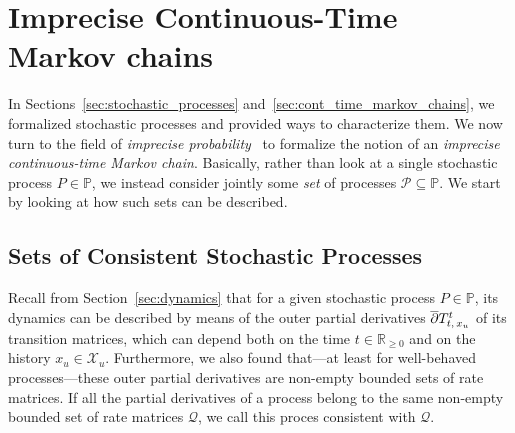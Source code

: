 \documentclass[10pt,a4paper]{paper}
\theoremstyle{definition}
\newtheorem{exmp}{Example}%
\newtheorem{proposition}[theorem]{Proposition}
\newcommand{\reals}{\mathbb{R}}
\newcommand{\realsnonneg}{\reals_{\geq 0}}
\newcommand{\states}{\mathcal{X}}
\newcommand{\processes}{\mathbb{P}}
\newcommand{\wmprocesses}{\processes^{\mathrm{WM}}}
\newcommand{\rateset}{\mathcal{Q}}
\newcommand{\exampleend}{\hfill$\Diamond$}
\begin{document}







\section{Imprecise Continuous-Time Markov chains}
\label{sec:iCTMC}

In Sections~\ref{sec:stochastic_processes} and~\ref{sec:cont_time_markov_chains}, we formalized stochastic processes and provided ways to characterize them. We now turn to the field of \emph{imprecise probability}~\cite{augustin2013:itip,Walley:1991vk} to formalize the notion of an \emph{imprecise continuous-time Markov chain}. Basically, rather than look at a single stochastic process $P\in\processes$, we instead consider jointly some \emph{set} of processes $\mathcal{P}\subseteq\processes$. We start by looking at how such sets can be described.

\subsection{Sets of Consistent Stochastic Processes}

Recall from Section~\ref{sec:dynamics} that for a given stochastic process $P\in\processes$, its dynamics can be described by means of the outer partial derivatives $\smash{\overline{\partial}}T_{t,\,x_u}^t$ of its transition matrices, which can depend both on the time $t\in\realsnonneg$ and on the history $x_u\in\states_u$. %
 Furthermore, we also found that---at least for well-behaved processes---these outer partial derivatives are non-empty bounded sets of rate matrices. If all the partial derivatives of a process belong to the same non-empty bounded set of rate matrices $\rateset$, we call this proces consistent with $\rateset$.
\end{document}
